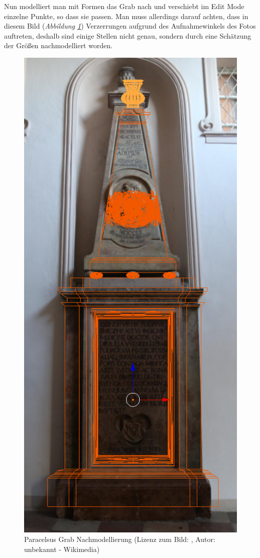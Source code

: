 Nun modelliert man mit Formen das Grab nach und verschiebt im Edit Mode einzelne Punkte, so dass sie passen. Man muss allerdings darauf achten, dass in diesem Bild
(\textit{Abbildung \ref{Paracelsus_Grab:image2}}) Verzerrungen aufgrund des Aufnahmewinkels des Fotos auftreten, deshalb sind einige Stellen nicht genau, sondern
durch eine Schätzung der Größen nachmodelliert worden.

\begin{figure}[H]
    \centering
    \includegraphics[width=.8\textwidth]{images/Paracelsus-Grab_Nachmodellierung.png}
    \caption{Paracelsus Grab Nachmodellierung (Lizenz zum Bild: \citep{paracelsusgrab:bild}, Autor: unbekannt - Wikimedia)}
    \label{Paracelsus_Grab:image2}
\end{figure}

